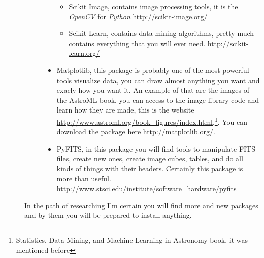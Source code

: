 \documentclass[11pt,fleqn]{book} %
\begin{document}
\begin{description}
\begin{description}
\begin{itemize}
\begin{itemize}
																																																																																																																							                    	\item Scikit Image, contains image processing tools, it is the \emph{OpenCV} for \emph{Python} \url{http://scikit-image.org/}
																																																																																																																										                        \item Scikit Learn, contains data mining algorithms, pretty much contains everything that you will ever need. \url{http://scikit-learn.org/}
																																																																																																																													                    \end{itemize}
																																																																																																																															                    \item Matplotlib, this package is probably one of the most powerful tools visualize data, you can draw almost anything you want and exacly how you want it. An example of that are the images of the AstroML book, you can access to the image library code and learn how they are made, this is the website \url{http://www.astroml.org/book_figures/index.html}.\footnote{Statistics, Data Mining, and Machine Learning in Astronomy book, it was mentioned before}. You can download the package here \url{http://matplotlib.org/}.
																																																																																																																																	                    \item PyFITS, in this package you will find tools to manipulate FITS files, create new ones, create image cubes, tables, and do all kinds of things with their headers. Certainly this package is more than useful. \url{http://www.stsci.edu/institute/software_hardware/pyfits}
																																																																																																																																			                \end{itemize}
																																																																																																																																					    \end{description}
																																																																																																																																					        In the path of researching I'm certain you will find more and new packages and by them you will be prepared to install anything.

\end{description}
\end{document}
